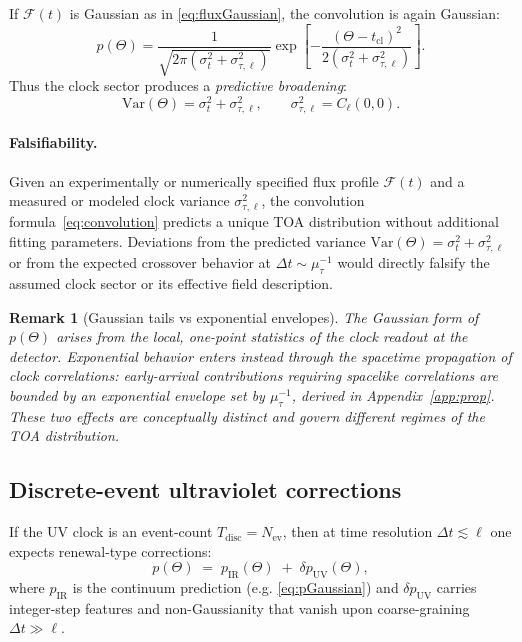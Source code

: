 \documentclass[pdflatex,sn-mathphys-num]{sn-jnl}
\theoremstyle{thmstylethree}
\theoremstyle{thmstyleone}
\theoremstyle{thmstyletwo}
\newtheorem{remark}{Remark}[section]
\numberwithin{equation}{section}
\newcommand{\Nev}{N_{\mathrm{ev}}}
\newcommand{\F}{\mathcal{F}}
\begin{document}
        If $\F(t)$ is Gaussian as in \eqref{eq:fluxGaussian}, the convolution is again Gaussian:
        \begin{equation}
            p(\Theta)=\frac{1}{\sqrt{2\pi(\sigma_t^2+\sigma_{\tau,\ell}^2)}}
            \exp\!\left[-\frac{(\Theta-t_{\mathrm{cl}})^2}{2(\sigma_t^2+\sigma_{\tau,\ell}^2)}\right].
            \label{eq:pGaussian}
        \end{equation}
        Thus the clock sector produces a \emph{predictive broadening}:
        \begin{equation}
            \mathrm{Var}(\Theta)=\sigma_t^2+\sigma_{\tau,\ell}^2,
            \qquad
            \sigma_{\tau,\ell}^2=C_\ell(0,0).
        \end{equation}
        
        \paragraph{Falsifiability.}
            Given an experimentally or numerically specified flux profile $\mathcal{F}(t)$ and a measured or modeled clock variance $\sigma_{\tau,\ell}^2$, the convolution formula~\eqref{eq:convolution} predicts a unique TOA distribution without additional fitting parameters. Deviations from the predicted variance $\mathrm{Var}(\Theta)=\sigma_t^2+\sigma_{\tau,\ell}^2$ or from the expected crossover behavior at $\Delta t\sim\mu_\tau^{-1}$ would directly falsify the assumed clock sector or its effective field description.
            
            \begin{remark}[Gaussian tails vs exponential envelopes]
The Gaussian form of $p(\Theta)$ arises from the \emph{local, one-point} statistics of the clock readout at the detector. Exponential behavior enters instead through the \emph{spacetime propagation} of clock correlations: early-arrival contributions requiring spacelike correlations are bounded by an exponential \emph{envelope} set by $\mu_\tau^{-1}$, derived in Appendix~\ref{app:prop}. These two effects are conceptually distinct and govern different regimes of the TOA distribution.
            \end{remark}
    
    \subsection{Discrete-event ultraviolet corrections}
    
    If the UV clock is an event-count $T_{\mathrm{disc}}=\Nev$, then at time resolution $\Delta t \lesssim \ell$ one expects renewal-type corrections:
    \begin{equation}
        p(\Theta)\;=\;p_{\mathrm{IR}}(\Theta)\;+\;\delta p_{\mathrm{UV}}(\Theta),
    \end{equation}
    where $p_{\mathrm{IR}}$ is the continuum prediction (e.g. \eqref{eq:pGaussian}) and $\delta p_{\mathrm{UV}}$ carries integer-step features and non-Gaussianity that vanish upon coarse-graining $\Delta t\gg \ell$.
    
\end{document}
